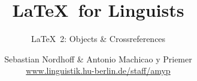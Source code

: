 


\title{
	\LaTeX\ for Linguists
}

\subtitle{\LaTeX\ 2: Objects \& Crossreferences}

\author[aMyP]{
	{\small Sebastian Nordhoff \& Antonio Machicao y Priemer}
	\\
	{\footnotesize \url{www.linguistik.hu-berlin.de/staff/amyp}}
}








\begin{frame}
  \HUtitle
\end{frame}





\nocite{Freitag&MyP15a}
\nocite{Knuth1986}
\nocite{Kopka94a}
\nocite{MyP17c}
\nocite{MyP&Kerkhof16a}
	


%
%
%
%
%


